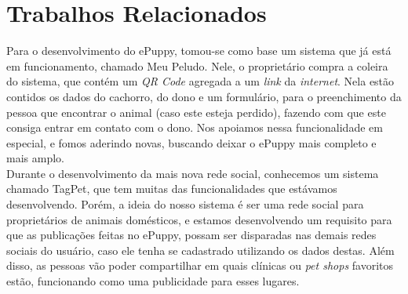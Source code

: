 \section{Trabalhos Relacionados}
Para o desenvolvimento do ePuppy, tomou-se como base um sistema que já está em funcionamento, chamado Meu Peludo. Nele, o proprietário compra a coleira do sistema, que contém um {\it QR Code} agregada a um {\it link} da {\it internet}. Nela estão contidos os dados do cachorro, do dono e um formulário, para o preenchimento da pessoa que encontrar o animal (caso este esteja perdido), fazendo com que este consiga entrar em contato com o dono. Nos apoiamos nessa funcionalidade em especial, e fomos aderindo novas, buscando deixar o ePuppy mais completo e mais amplo.
\\
\indent
Durante o desenvolvimento da mais nova rede social, conhecemos um sistema chamado TagPet, que tem muitas das funcionalidades que estávamos desenvolvendo. Porém, a ideia do nosso sistema é ser uma rede social para proprietários de animais domésticos, e estamos desenvolvendo um requisito para que as publicações feitas no ePuppy, possam ser disparadas nas demais redes sociais do usuário, caso ele tenha se cadastrado utilizando os dados destas. Além disso, as pessoas vão poder compartilhar em quais clínicas ou {\it pet shops} favoritos estão, funcionando como uma publicidade para esses lugares.



